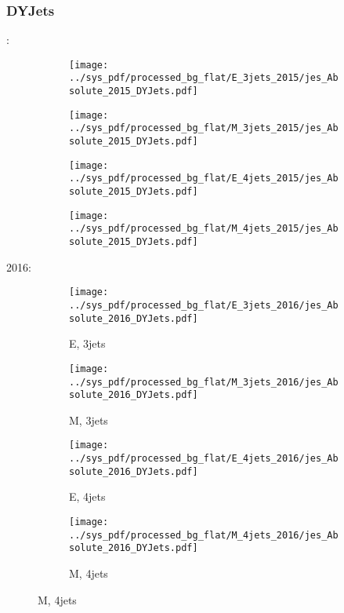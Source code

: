 \documentclass{beamer}
\begin{document}
\begin{frame}
\frametitle{DYJets}
\fontsize{5}{1}:
\begin{figure}
\centering
\begin{subfigure}[b]{0.24\textwidth}
\texttt{[image: ../sys\_pdf/processed\_bg\_flat/E\_3jets\_2015/jes\_Absolute\_2015\_DYJets.pdf]}
\end{subfigure}
\begin{subfigure}[b]{0.24\textwidth}
\texttt{[image: ../sys\_pdf/processed\_bg\_flat/M\_3jets\_2015/jes\_Absolute\_2015\_DYJets.pdf]}
\end{subfigure}
\begin{subfigure}[b]{0.24\textwidth}
\texttt{[image: ../sys\_pdf/processed\_bg\_flat/E\_4jets\_2015/jes\_Absolute\_2015\_DYJets.pdf]}
\end{subfigure}
\begin{subfigure}[b]{0.24\textwidth}
\texttt{[image: ../sys\_pdf/processed\_bg\_flat/M\_4jets\_2015/jes\_Absolute\_2015\_DYJets.pdf]}
\end{subfigure}
\end{figure}
2016:
\begin{figure}
\centering
\begin{subfigure}[b]{0.24\textwidth}
\texttt{[image: ../sys\_pdf/processed\_bg\_flat/E\_3jets\_2016/jes\_Absolute\_2016\_DYJets.pdf]}
\captionsetup{font=tiny}
\caption{E, 3jets}
\end{subfigure}
\begin{subfigure}[b]{0.24\textwidth}
\texttt{[image: ../sys\_pdf/processed\_bg\_flat/M\_3jets\_2016/jes\_Absolute\_2016\_DYJets.pdf]}
\captionsetup{font=tiny}
\caption{M, 3jets}
\end{subfigure}
\begin{subfigure}[b]{0.24\textwidth}
\texttt{[image: ../sys\_pdf/processed\_bg\_flat/E\_4jets\_2016/jes\_Absolute\_2016\_DYJets.pdf]}
\captionsetup{font=tiny}
\caption{E, 4jets}
\end{subfigure}
\begin{subfigure}[b]{0.24\textwidth}
\texttt{[image: ../sys\_pdf/processed\_bg\_flat/M\_4jets\_2016/jes\_Absolute\_2016\_DYJets.pdf]}
\captionsetup{font=tiny}
\caption{M, 4jets}
\end{subfigure}
\end{figure}
\end{frame}
\end{document}
